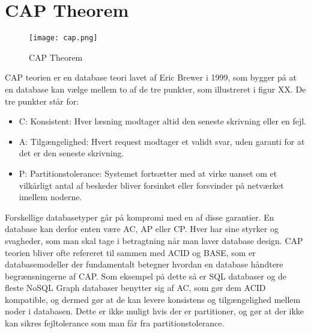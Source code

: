 \section{CAP Theorem}
\begin{figure}[H]
    \centering
    \texttt{[image: cap.png]}
    \caption{CAP Theorem}
    \label{fig::cap}
\end{figure}

CAP teorien er en database teori lavet af Eric Brewer i 1999, som bygger på at en database kan vælge mellem to af de tre punkter, som illustreret i figur XX. De tre punkter står for: 
\begin{itemize}
    \item C: Konsistent: Hver læsning modtager altid den seneste skrivning eller en fejl.
    \item A: Tilgængelighed: Hvert request modtager et validt svar, uden garanti for at det er den seneste skrivning.
    \item P: Partitionstolerance: Systemet fortsætter med at virke uanset om et vilkårligt antal af beskeder bliver forsinket eller forsvinder på netværket imellem noderne. 
\end{itemize}
Forskellige databasetyper går på kompromi med en af disse garantier. En database kan derfor enten være AC, AP eller CP. Hver har sine styrker og svagheder, som man skal tage i betragtning når man laver database design. CAP teorien bliver ofte refereret til sammen med ACID og BASE, som er databasemodeller der fundamentalt betegner hvordan en database håndtere begrænsningerne af CAP. Som eksempel på dette så er SQL databaser og de fleste NoSQL Graph databaser benytter sig af AC, som gør dem ACID kompatible, og dermed gør at de kan levere konsistens og tilgængelighed mellem noder i databasen. Dette er ikke muligt hvis der er partitioner, og gør at der ikke kan sikres fejltolerance som man får fra partitionstolerance. 